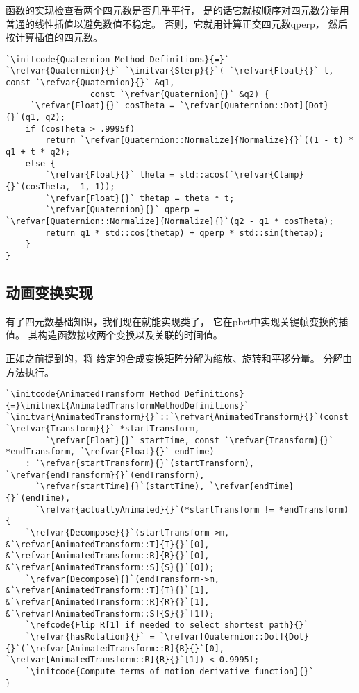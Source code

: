 函数的实现检查看两个四元数是否几乎平行，
是的话它就按顺序对四元数分量用普通的线性插值以避免数值不稳定。
否则，它就用计算正交四元数{\ttfamily qperp}，
然后按计算插值的四元数。
\begin{lstlisting}
`\initcode{Quaternion Method Definitions}{=}`
`\refvar{Quaternion}{}` `\initvar{Slerp}{}`( `\refvar{Float}{}` t, const `\refvar{Quaternion}{}` &q1,
                 const `\refvar{Quaternion}{}` &q2) {
     `\refvar{Float}{}` cosTheta = `\refvar[Quaternion::Dot]{Dot}{}`(q1, q2);
    if (cosTheta > .9995f)
        return `\refvar[Quaternion::Normalize]{Normalize}{}`((1 - t) * q1 + t * q2);
    else {
        `\refvar{Float}{}` theta = std::acos(`\refvar{Clamp}{}`(cosTheta, -1, 1));
        `\refvar{Float}{}` thetap = theta * t;
        `\refvar{Quaternion}{}` qperp = `\refvar[Quaternion::Normalize]{Normalize}{}`(q2 - q1 * cosTheta);
        return q1 * std::cos(thetap) + qperp * std::sin(thetap);
    }
}
\end{lstlisting}

\subsection{动画变换实现}\label{sub:动画变换实现}
有了四元数基础知识，我们现在就能实现类了，
它在pbrt中实现关键帧变换的插值。
其构造函数接收两个变换以及关联的时间值。

正如之前提到的，将
给定的合成变换矩阵分解为缩放、旋转和平移分量。
分解由方法执行。

\begin{lstlisting}
`\initcode{AnimatedTransform Method Definitions}{=}\initnext{AnimatedTransformMethodDefinitions}`
`\initvar{AnimatedTransform}{}`::`\refvar{AnimatedTransform}{}`(const `\refvar{Transform}{}` *startTransform,
        `\refvar{Float}{}` startTime, const `\refvar{Transform}{}` *endTransform, `\refvar{Float}{}` endTime)
    : `\refvar{startTransform}{}`(startTransform), `\refvar{endTransform}{}`(endTransform),
      `\refvar{startTime}{}`(startTime), `\refvar{endTime}{}`(endTime),
      `\refvar{actuallyAnimated}{}`(*startTransform != *endTransform) {
    `\refvar{Decompose}{}`(startTransform->m, &`\refvar[AnimatedTransform::T]{T}{}`[0], &`\refvar[AnimatedTransform::R]{R}{}`[0], &`\refvar[AnimatedTransform::S]{S}{}`[0]);
    `\refvar{Decompose}{}`(endTransform->m, &`\refvar[AnimatedTransform::T]{T}{}`[1], &`\refvar[AnimatedTransform::R]{R}{}`[1], &`\refvar[AnimatedTransform::S]{S}{}`[1]);
    `\refcode{Flip R[1] if needed to select shortest path}{}`
    `\refvar{hasRotation}{}` = `\refvar[Quaternion::Dot]{Dot}{}`(`\refvar[AnimatedTransform::R]{R}{}`[0], `\refvar[AnimatedTransform::R]{R}{}`[1]) < 0.9995f;
    `\initcode{Compute terms of motion derivative function}{}`
}
\end{lstlisting}


